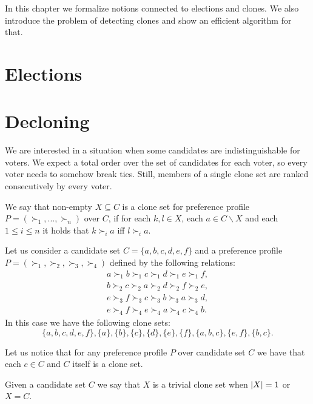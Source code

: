 In this chapter we formalize notions connected to elections and clones.
We also introduce the problem of detecting clones and show an efficient algorithm for that.

\section{Elections} 

\section{Decloning}

We are interested in a situation when some candidates are indistinguishable for voters.
We expect a total order over the set of candidates for each voter,
so every voter needs to somehow break ties.
Still, members of a single clone set are ranked consecutively by every voter.

\begin{defn}
We say that non-empty $X \subseteq C$ is a clone set for preference profile $P = (\succ_1, ... , \succ_n)$ over $C$,
if for each $k,l \in X$, each $a \in C \backslash X$ and each $1 \leq i \leq n $ it holds that
$k \succ_i a$ iff $l \succ_i a$.
\end{defn}

\begin{exmp} \label{clone-sets}
Let us consider a candidate set $C = \{a,b,c,d,e,f\}$
and a preference profile $P = (\succ_1, \succ_2, \succ_3, \succ_4)$ defined by the following relations:
\begin{align*}
a \succ_1 b \succ_1 c \succ_1 d \succ_1 e \succ_1 f, \\
b \succ_2 c \succ_2 a \succ_2 d \succ_2 f \succ_2 e, \\
e \succ_3 f \succ_3 c \succ_3 b \succ_3 a \succ_3 d, \\
e \succ_4 f \succ_4 e \succ_4 a \succ_4 c \succ_4 b.
\end{align*}
In this case we have the following clone sets:
$$\{a,b,c,d,e,f\}, \{a\}, \{b\}, \{c\}, \{d\}, \{e\}, \{f\}, \{a,b,c\}, \{e,f\}, \{b,c\}.$$
\end{exmp}

\begin{rmrk}
Let us notice that for any preference profile $P$ over candidate set $C$
we have that each $c \in C$ and $C$ itself is a clone set.
\end{rmrk}

\begin{defn}
Given a candidate set $C$ we say that $X$ is a trivial clone set
when $\left\vert X \right\vert = 1$ or $X = C$.
\end{defn}

